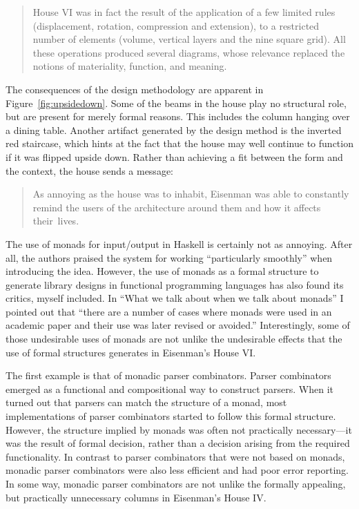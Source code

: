 \begin{quote}
House VI was in fact the result of the application of a few limited rules
(displacement, rotation, compression and extension), to a restricted number of
elements (volume, vertical layers and the nine square grid). All these operations
produced several diagrams, whose relevance replaced the notions of materiality,
function, and meaning.
\end{quote}

The consequences of the design methodology are apparent in Figure~\ref{fig:upsidedown}.
Some of the beams in the house play no structural role, but are present for merely formal
reasons. This includes the column hanging over a dining table. Another artifact generated
by the design method is the inverted red staircase, which hints at the fact that the house
may well continue to function if it was flipped upside down. Rather than achieving a fit between
the form and the context, the house sends a message:

\begin{quote}
As annoying as the house was to inhabit, Eisenman was able to constantly
remind the users of the architecture around them and how it affects
their~lives.
\end{quote}

The use of monads for input/output in Haskell is certainly not as annoying. After all, the
authors praised the system for working ``particularly smoothly'' when introducing the idea.
However, the use of monads as a formal structure to generate library designs in functional
programming languages has also found its critics, myself included. In ``What we talk about when we
talk about monads'' I pointed out that ``there are a number of cases where monads
were used in an academic paper and their use was later revised or avoided.''
Interestingly, some of those undesirable uses of monads are not unlike the undesirable effects
that the use of formal structures generates in Eisenman's House VI.

The first example is that of monadic parser combinators. Parser combinators
emerged as a functional and compositional way to construct parsers. When it turned out that
parsers can match the structure of a monad, most implementations of parser combinators
started to follow this formal structure. However, the structure implied by monads was often
not practically necessary---it was the result of formal decision, rather than a decision
arising from the required functionality. In contrast to parser combinators that were not based
on monads, monadic parser combinators were also less efficient and had poor error reporting.
In some way, monadic parser combinators are not unlike the formally appealing, but practically
unnecessary columns in Eisenman's House IV.

